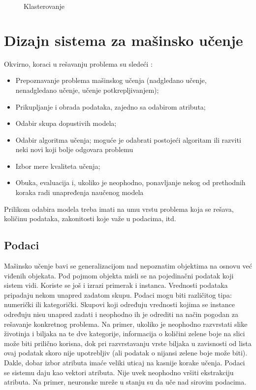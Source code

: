 \begin{figure}
	\centering
	\resizebox{.8\linewidth}{!}{}
	\caption{Klasterovanje}
	\label{fig:klaster}
\end{figure}

\section{Dizajn sistema za mašinsko učenje}

Okvirno, koraci u rešavanju problema su sledeći \cite{janicic_vi}:
\begin{itemize}
	\item Prepoznavanje problema mašinskog učenja (nadgledano učenje, \\nenadgledano učenje, učenje potkrepljivanjem);
	\item Prikupljanje i obrada podataka, zajedno sa odabirom atributa;
	\item Odabir skupa dopustivih modela;
	\item Odabir algoritma učenja; moguće je odabrati postojeći algoritam ili razviti neki novi koji bolje odgovara problemu
	\item Izbor mere kvaliteta učenja;
	\item Obuka, evaluacija i, ukoliko je neophodno, ponavljanje nekog od prethodnih koraka radi unapređenja naučenog modela 
\end{itemize}

Prilikom odabira modela treba imati na umu vrstu problema koja se rešava, količinu podataka, zakonitosti koje važe u podacima, itd.


\subsection{Podaci}

Mašinsko učenje bavi se generalizacijom nad nepoznatim objektima na osnovu već viđenih objekata. Pod pojmom objekta misli se na pojedinačni podatak koji sistem vidi. Koriste se još i izrazi primerak i instanca. Vrednosti podataka pripadaju nekom unapred zadatom skupu. Podaci mogu biti različitog tipa: numerički ili kategorički. Skupovi koji određuju vrednosti kojima se instance određuju nisu unapred zadati i neophodno ih je odrediti na način pogodan za rešavanje konkretnog problema. Na primer, ukoliko je neophodno razvrstati slike životinja i biljaka na te dve kategorije, informacija o količini zelene boje na slici može biti prilično korisna, dok pri razvrstavanju vrste biljaka u zavisnosti od lista ovaj podatak skoro nije upotrebljiv (ali podatak o nijansi zelene boje može biti). Dakle, dobar izbor atributa imaće veliki uticaj na kasnije korake učenja. Podaci se sistemu daju kao vektori atributa. Nije uvek neophodno vršiti ekstrakciju atributa. Na primer, neuronske mreže u stanju su da uče nad sirovim podacima.
\par

